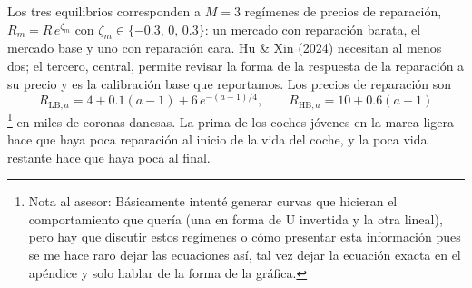 \documentclass{article}
\begin{document}
Los tres equilibrios corresponden a $M=3$ regímenes de precios de reparación, $R_m=R\,e^{\zeta_m}$ con $\zeta_m\in\{-0.3,\,0,\,0.3\}$: un mercado con reparación barata, el mercado base y uno con reparación cara. Hu \& Xin (2024) necesitan al menos dos; el tercero, central, permite revisar la forma de la respuesta de la reparación a su precio y es la calibración base que reportamos. Los precios de reparación son
$$R_{\text{LB},a}=4+0.1(a-1)+6\,e^{-(a-1)/4},\qquad R_{\text{HB},a}=10+0.6(a-1)$$\footnote{Nota al asesor: Básicamente intenté generar curvas que hicieran el comportamiento que quería (una en forma de U invertida y la otra lineal), pero hay que discutir estos regímenes o cómo presentar esta información pues se me hace raro dejar las ecuaciones así, tal vez dejar la ecuación exacta en el apéndice y solo hablar de la forma de la gráfica.}
en miles de coronas danesas. La prima de los coches jóvenes en la marca ligera hace que haya poca reparación al inicio de la vida del coche, y la poca vida restante hace que haya poca al final.
\end{document}
